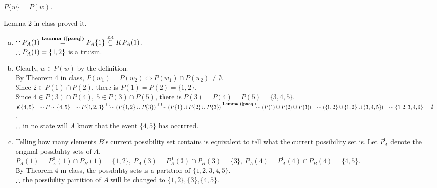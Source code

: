 \begin{pr}
\begin{lm}\label{paeq}
$P\{w\}=P(w)$.
\end{lm}
\begin{rmk}
Lemma 2 in class proved it.
\end{rmk}
\begin{enumerate}[(a)]
\item $\cuz P_A(1)\overtext{\rflm{paeq}}=P_A\{1\}\overtext{K4}\subseteq KP_A(1)$.\\
$\therefore P_A(1)=\{1, 2\}$ is a truism.
\item Clearly, $w\in P(w)$ by the definition.\\
By Theorem 4 in class, $P(w_1)=P(w_2)\iff P(w_1)\cap P(w_2)\neq\emptyset$.\\
Since $2\in P(1)\cap P(2)$, there is $P(1)=P(2)=\{1, 2\}$.\\
Since $4\in P(3)\cap P(4),\ 5\in P(3)\cap P(5)$, there is $P(3)=P(4)=P(5)=\{3, 4, 5\}$.\\
$K\{4, 5\}=\sim P\sim\{4, 5\}=\sim P\{1, 2, 3\}\overtext{P1}=\sim(P\{1, 2\}\cup P\{3\})\overtext{P1}=\sim(P\{1\}\cup P\{2\}\cup P\{3\})\overtext{\rflm{paeq}}=\sim(P(1)\cup P(2)\cup P(3))=\sim(\{1, 2\}\cup\{1, 2\}\cup\{3, 4, 5\})=\sim\{1, 2, 3, 4, 5\}=\emptyset$.\\
$\therefore$ in no state will $A$ know that the event $\{4, 5\}$ has occurred.
\item Telling how many elements $B$'s current possibility set contains is equivalent to tell what the current possibility set is. Let $P^0_A$ denote the original possibility sets of $A$. $P_A(1)=P^0_A(1)\cap P_B(1)=\{1, 2\},\ P_A(3)=P^0_A(3)\cap P_B(3)=\{3\},\ P_A(4)=P^0_A(4)\cap P_B(4)=\{4, 5\}$.\\
By Theorem 4 in class, the possibility sets is a partition of $\{1, 2, 3, 4, 5\}$.\\
$\therefore$ the possibility partition of $A$ will be changed to $\{1, 2\}, \{3\}, \{4, 5\}$.
\end{enumerate}
\end{pr}
